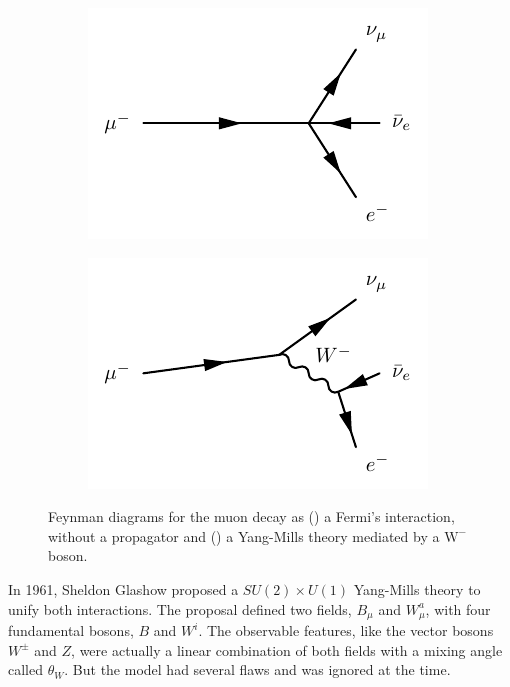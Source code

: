 \begin{figure}
\centering
\begin{subfigure}[b]{0.5\textwidth}
  \centering
  \includegraphics[width=\textwidth]{Images/fermi1.pdf}
  \caption{\label{fig:fermi_int}}
\end{subfigure}%
\begin{subfigure}[b]{0.5\textwidth}
  \centering
  \includegraphics[width=\textwidth]{Images/fermi2.pdf}
  \caption{\label{fig:melectroweak}}
\end{subfigure}
\caption{Feynman diagrams for the muon decay as () a Fermi's interaction, without a propagator and () a Yang-Mills theory mediated by a $\mathrm{W}^{-}$ boson.}
\label{fig:etomununu}
\end{figure}

In 1961, Sheldon Glashow proposed a $SU(2) \times U(1)$ Yang-Mills theory \cite{GLASHOW1961579} to unify both interactions.  The proposal defined two fields, $B_{\mu}$ and $W_{\mu}^a$, with four fundamental bosons, $B$ and $W^i$. The observable features, like the vector bosons $W^{\pm}$ and $Z$, were actually a linear combination of both fields with a mixing angle called $\theta_W$. But the model had several flaws and was ignored at the time.

